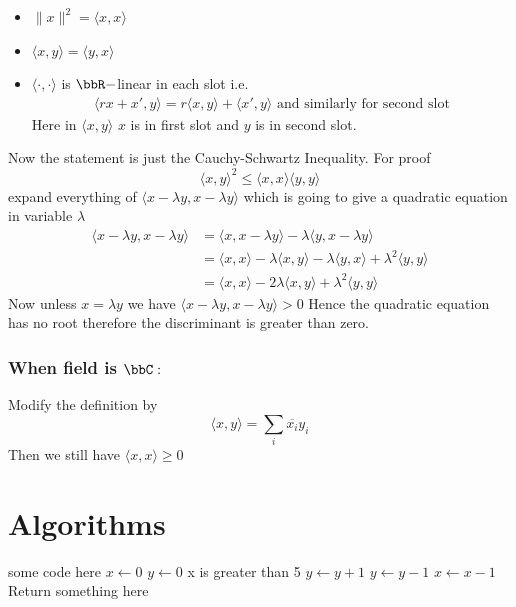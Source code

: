{	\begin{note}
		\begin{itemize}
			\item $\|x\|^2=\langle x,x\rangle$
			\item $\langle x,y\rangle=\langle y,x\rangle$
			\item $\langle \cdot,\cdot\rangle$ is $\bbR-$linear in each slot i.e. \begin{align*}
				      \langle rx+x',y\rangle=r\langle x,y\rangle+\langle x',y\rangle	\text{ and similarly for second slot}
			      \end{align*}Here in $\langle x,y\rangle$ $x$ is in first slot and $y$ is in second slot.
		\end{itemize}
	\end{note}Now the statement is just the Cauchy-Schwartz Inequality. For proof $$\langle x,y\rangle^2\leq \langle x,x\rangle\langle y,y\rangle $$ expand everything of $\langle x-\lambda y,x-\lambda y\rangle$ which is going to give a quadratic equation in variable $\lambda $ \begin{align*}
		\langle x-\lambda y,x-\lambda y\rangle & =\langle x,x-\lambda y\rangle-\lambda\langle y,x-\lambda y\rangle                                       \\
		                                       & =\langle x ,x\rangle -\lambda\langle x,y\rangle -\lambda\langle y,x\rangle +\lambda^2\langle y,y\rangle \\
		                                       & =\langle x,x\rangle -2\lambda\langle x,y\rangle+\lambda^2\langle y,y\rangle
	\end{align*}Now unless $x=\lambda y$ we have $\langle x-\lambda y,x-\lambda y\rangle>0$ Hence the quadratic equation has no root therefore the discriminant is greater than zero.

	\subsubsection*{\textbf{When field is $\bbC:$}}Modify the definition by $$\langle x,y\rangle=\sum_i\overline{x_i}y_i$$Then we still have $\langle x,x\rangle\geq 0$}

\section{Algorithms}
\begin{algorithm}[H]
\SetAlgoLined
\SetNoFillComment
{}
\vspace{3mm}
some code here\;
$x \leftarrow 0$\;
$y \leftarrow 0$\;
 {
    x is greater than 5 
}
 {
    $y \leftarrow y + 1$\;
}
 {
    $y \leftarrow y - 1$\;
}
 {
    $x \leftarrow x - 1$\;
}
\Return Return something here\;
\caption{what}
\end{algorithm}

